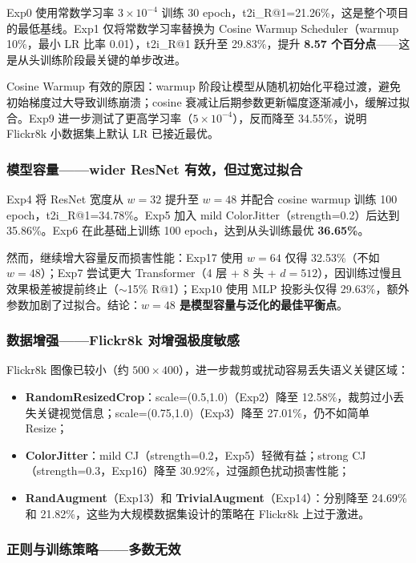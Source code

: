 \documentclass[12pt,a4paper]{article}
\begin{document}
Exp0 使用常数学习率 $3\times 10^{-4}$ 训练 30 epoch，t2i\_R@1=21.26\%，这是整个项目的最低基线。Exp1 仅将常数学习率替换为 Cosine Warmup Scheduler（warmup 10\%，最小 LR 比率 0.01），t2i\_R@1 跃升至 29.83\%，提升 \textbf{8.57 个百分点}——这是从头训练阶段最关键的单步改进。

Cosine Warmup 有效的原因：warmup 阶段让模型从随机初始化平稳过渡，避免初始梯度过大导致训练崩溃；cosine 衰减让后期参数更新幅度逐渐减小，缓解过拟合。Exp9 进一步测试了更高学习率（$5\times 10^{-4}$），反而降至 34.55\%，说明 Flickr8k 小数据集上默认 LR 已接近最优。

\subsubsection{模型容量——wider ResNet 有效，但过宽过拟合}

Exp4 将 ResNet 宽度从 $w=32$ 提升至 $w=48$ 并配合 cosine warmup 训练 100 epoch，t2i\_R@1=34.78\%。Exp5 加入 mild ColorJitter（strength=0.2）后达到 35.86\%。Exp6 在此基础上训练 100 epoch，达到从头训练最优 \textbf{36.65\%}。

然而，继续增大容量反而损害性能：Exp17 使用 $w=64$ 仅得 32.53\%（不如 $w=48$）；Exp7 尝试更大 Transformer（4 层 + 8 头 + $d=512$），因训练过慢且效果极差被提前终止（$\sim$15\% R@1）；Exp10 使用 MLP 投影头仅得 29.63\%，额外参数加剧了过拟合。结论：\textbf{$w=48$ 是模型容量与泛化的最佳平衡点}。

\subsubsection{数据增强——Flickr8k 对增强极度敏感}

Flickr8k 图像已较小（约 $500\times 400$），进一步裁剪或扰动容易丢失语义关键区域：

\begin{itemize}[nosep]
    \item \textbf{RandomResizedCrop}：scale=(0.5,1.0)（Exp2）降至 12.58\%，裁剪过小丢失关键视觉信息；scale=(0.75,1.0)（Exp3）降至 27.01\%，仍不如简单 Resize；
    \item \textbf{ColorJitter}：mild CJ（strength=0.2，Exp5）轻微有益；strong CJ（strength=0.3，Exp16）降至 30.92\%，过强颜色扰动损害性能；
    \item \textbf{RandAugment}（Exp13）和 \textbf{TrivialAugment}（Exp14）：分别降至 24.69\% 和 21.82\%，这些为大规模数据集设计的策略在 Flickr8k 上过于激进。
\end{itemize}

\subsubsection{正则与训练策略——多数无效}
\end{document}
